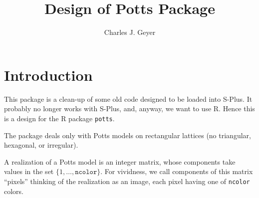 \documentclass[11pt]{article}
\begin{document}
\title{Design of Potts Package}

\author{Charles J. Geyer}

\maketitle

\section{Introduction}

This package is a clean-up of some old code designed to be loaded into S-Plus.
It probably no longer works with S-Plus, and, anyway, we want to use R.
Hence this is a design for the R package \texttt{potts}.

The package deals only with Potts models on rectangular lattices
(no triangular, hexagonal, or irregular).

A realization of a Potts model is an integer matrix, whose components take
values in the set $\{ 1, \ldots, \texttt{ncolor} \}$.  For vividness, we call
components of this matrix ``pixels'' thinking of the realization as an image,
each pixel having one of \texttt{ncolor} colors.
\end{document}
